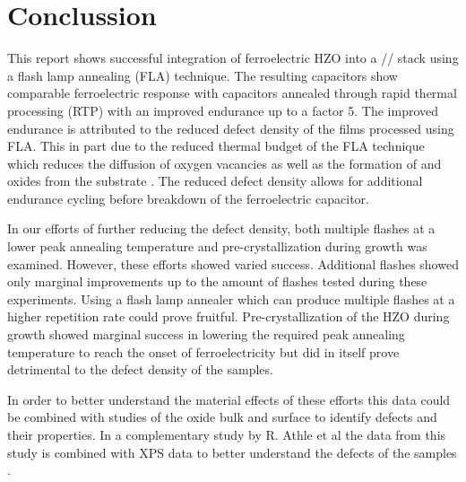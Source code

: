 \documentclass[11pt,twoside]{eitExjobb}
\begin{document}
\chapter{Conclussion}\label{chap:conc}

This report shows successful integration of ferroelectric HZO into a
// stack using a flash lamp annealing (FLA) technique. The
resulting capacitors show comparable ferroelectric response with capacitors
annealed through rapid thermal processing (RTP) with an improved endurance up
to a factor 5. The improved endurance is attributed to the reduced defect
density of the films processed using FLA. This in part due to the reduced
thermal budget of the FLA technique which reduces the diffusion of oxygen
vacancies as well as the formation of  and  oxides from the
substrate \cite{kang2016structural}. The reduced defect density allows for
additional endurance cycling before breakdown of the ferroelectric capacitor.

In our efforts of further reducing the defect density, both multiple flashes at
a lower peak annealing temperature and pre-crystallization during growth was
examined. However, these efforts showed varied success. Additional flashes
showed only marginal improvements up to the amount of flashes tested during
these experiments. Using a flash lamp annealer which can produce multiple
flashes at a higher repetition rate could prove fruitful. Pre-crystallization
of the HZO during growth showed marginal success in lowering the required peak
annealing temperature to reach the onset of ferroelectricity but did in itself
prove detrimental to the defect density of the samples.

In order to better understand the material effects of these efforts this data
could be combined with studies of the oxide bulk and surface to identify
defects and their properties. In a complementary study by R. Athle et al the
data from this study is combined with XPS data to better understand the
defects of the samples \cite{athle2022improved}.





\appendix
\end{document}
